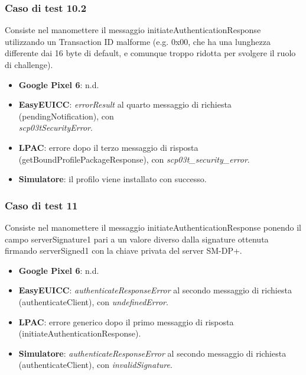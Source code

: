 \documentclass[10pt, oneside]{book}
\begin{document}
\subsubsection{Caso di test 10.2}
Consiste nel manomettere il messaggio initiateAuthenticationResponse utilizzando un Transaction ID malforme (e.g. 0x00, che ha una lunghezza differente dai 16 byte di default, e comunque troppo ridotta per svolgere il ruolo di challenge).
\begin{itemize}
\item \textbf{Google Pixel 6}: n.d.
\item \textbf{EasyEUICC}: \textit{errorResult} al quarto messaggio di richiesta (pendingNotification), con\\ \textit{scp03tSecurityError}.
\item \textbf{LPAC}: errore dopo il terzo messaggio di risposta (getBoundProfilePackageResponse), con \textit{scp03t\_security\_error}.
\item \textbf{Simulatore}: il profilo viene installato con successo.
\end{itemize}

\subsubsection{Caso di test 11}
Consiste nel manomettere il messaggio initiateAuthenticationResponse ponendo il campo serverSignature1 pari a un valore diverso dalla signature ottenuta firmando serverSigned1 con la chiave privata del server SM-DP+.
\begin{itemize}
\item \textbf{Google Pixel 6}: n.d.
\item \textbf{EasyEUICC}: \textit{authenticateResponseError} al secondo messaggio di richiesta (authenticateClient), con \textit{undefinedError}.
\item \textbf{LPAC}: errore generico dopo il primo messaggio di risposta (initiateAuthenticationResponse).
\item \textbf{Simulatore}: \textit{authenticateResponseError} al secondo messaggio di richiesta (authenticateClient), con \textit{invalidSignature}.
\end{itemize}
\end{document}
